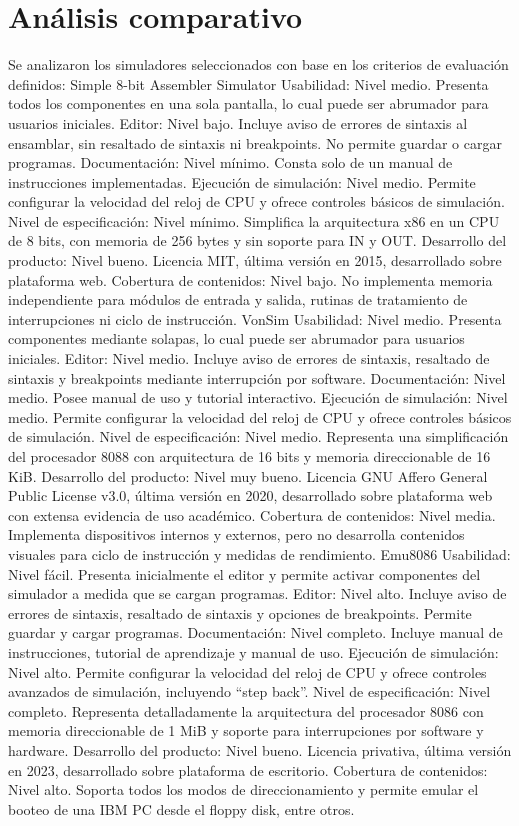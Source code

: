 \documentclass[12pt,twoside]{templates/unerthesis}
\begin{document}
\hypertarget{anuxe1lisis-comparativo}{%
\section{Análisis comparativo}\label{anuxe1lisis-comparativo}}

Se analizaron los simuladores seleccionados con base en los criterios de evaluación definidos:
Simple 8-bit Assembler Simulator
Usabilidad: Nivel medio. Presenta todos los componentes en una sola pantalla, lo cual puede ser abrumador para usuarios iniciales.
Editor: Nivel bajo. Incluye aviso de errores de sintaxis al ensamblar, sin resaltado de sintaxis ni breakpoints. No permite guardar o cargar programas.
Documentación: Nivel mínimo. Consta solo de un manual de instrucciones implementadas.
Ejecución de simulación: Nivel medio. Permite configurar la velocidad del reloj de CPU y ofrece controles básicos de simulación.
Nivel de especificación: Nivel mínimo. Simplifica la arquitectura x86 en un CPU de 8 bits, con memoria de 256 bytes y sin soporte para IN y OUT.
Desarrollo del producto: Nivel bueno. Licencia MIT, última versión en 2015, desarrollado sobre plataforma web.
Cobertura de contenidos: Nivel bajo. No implementa memoria independiente para módulos de entrada y salida, rutinas de tratamiento de interrupciones ni ciclo de instrucción.
VonSim
Usabilidad: Nivel medio. Presenta componentes mediante solapas, lo cual puede ser abrumador para usuarios iniciales.
Editor: Nivel medio. Incluye aviso de errores de sintaxis, resaltado de sintaxis y breakpoints mediante interrupción por software.
Documentación: Nivel medio. Posee manual de uso y tutorial interactivo.
Ejecución de simulación: Nivel medio. Permite configurar la velocidad del reloj de CPU y ofrece controles básicos de simulación.
Nivel de especificación: Nivel medio. Representa una simplificación del procesador 8088 con arquitectura de 16 bits y memoria direccionable de 16 KiB.
Desarrollo del producto: Nivel muy bueno. Licencia GNU Affero General Public License v3.0, última versión en 2020, desarrollado sobre plataforma web con extensa evidencia de uso académico.
Cobertura de contenidos: Nivel media. Implementa dispositivos internos y externos, pero no desarrolla contenidos visuales para ciclo de instrucción y medidas de rendimiento.
Emu8086
Usabilidad: Nivel fácil. Presenta inicialmente el editor y permite activar componentes del simulador a medida que se cargan programas.
Editor: Nivel alto. Incluye aviso de errores de sintaxis, resaltado de sintaxis y opciones de breakpoints. Permite guardar y cargar programas.
Documentación: Nivel completo. Incluye manual de instrucciones, tutorial de aprendizaje y manual de uso.
Ejecución de simulación: Nivel alto. Permite configurar la velocidad del reloj de CPU y ofrece controles avanzados de simulación, incluyendo ``step back''.
Nivel de especificación: Nivel completo. Representa detalladamente la arquitectura del procesador 8086 con memoria direccionable de 1 MiB y soporte para interrupciones por software y hardware.
Desarrollo del producto: Nivel bueno. Licencia privativa, última versión en 2023, desarrollado sobre plataforma de escritorio.
Cobertura de contenidos: Nivel alto. Soporta todos los modos de direccionamiento y permite emular el booteo de una IBM PC desde el floppy disk, entre otros.
\end{document}
